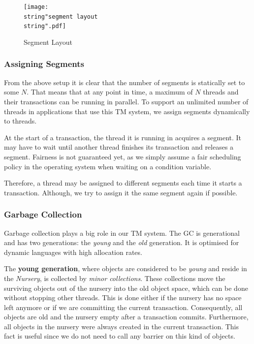 \documentclass{sigplanconf}
\begin{document}
\begin{figure}[t]
  \centering
  \texttt{[image: \\string"segment layout\\string".pdf]}
  \caption{Segment Layout\label{fig:Segment-Layout}}
\end{figure}



\subsubsection{Assigning Segments}

From the above setup it is clear that the number of segments is
statically set to some $N$. That means that at any point in time, a
maximum of $N$ threads and their transactions can be running in
parallel.  To support an unlimited number of threads in applications
that use this TM system, we assign segments dynamically to threads.

At the start of a transaction, the thread it is running in acquires a
segment. It may have to wait until another thread finishes its
transaction and releases a segment. Fairness is not guaranteed yet, as
we simply assume a fair scheduling policy in the operating system when
waiting on a condition variable.

Therefore, a thread may be assigned to different segments each time it
starts a transaction. Although, we try to assign it the same segment
again if possible.




\subsubsection{Garbage Collection}

Garbage collection plays a big role in our TM system. The GC is
generational and has two generations: the \emph{young} and the
\emph{old} generation. It is optimised for dynamic languages with
high allocation rates.

The \textbf{young generation}, where objects are considered to be
\emph{young} and reside in the \emph{Nursery}, is collected by
\emph{minor collections}. These collections move the surviving objects
out of the nursery into the old object space, which can be done
without stopping other threads. This is done either if the nursery has
no space left anymore or if we are committing the current
transaction. Consequently, all objects are old and the nursery empty
after a transaction commits.  Furthermore, all objects in the nursery
were always created in the current transaction. This fact is useful
since we do not need to call any barrier on this kind of objects.
\end{document}
